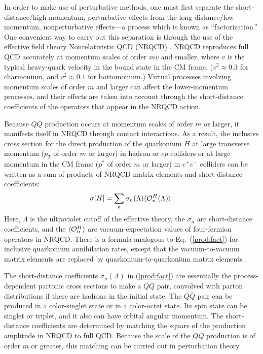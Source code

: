In order to make use of perturbative methods, one must first separate
the short-distance/high-momentum, perturbative effects from the
long-distance/low-momentum, nonperturbative effects---a process which is
known as ``factorization.'' One convenient way to carry out this
separation is through the use of the effective field theory
Nonrelativistic QCD (NRQCD) \cite{Caswell:1985ui,Thacker:1990bm,Bodwin:1994jh}.
NRQCD reproduces full QCD accurately at momentum scales of order $mv$
and smaller, where $v$ is the typical heavy-quark velocity in the bound
state in the CM frame. ($v^2\approx 0.3$ for charmonium, and 
$v^2\approx 0.1$ for bottomonium.) Virtual processes involving momentum
scales of order $m$ and larger can affect the lower-momentum processes,
and their effects are taken into account through the short-distance
coefficients of the operators that appear in the NRQCD action.

Because $Q\bar Q$ production occurs at momentum scales of order $m$ or
larger, it manifests itself in NRQCD through contact interactions. As a
result, the inclusive cross section for the direct production of the
quarkonium $H$ at large transverse momentum ($p_T$ of order $m$ or
larger) in hadron or $ep$ colliders or at large momentum in the CM frame
($p^*$ of order $m$ or larger) in $e^+e^-$ colliders can be written as a
sum of products of NRQCD matrix elements and short-distance coefficients:
%
\begin{equation}
\sigma[H]=\sum_n \sigma_n(\Lambda) \langle {\cal O}_n^H(\Lambda) \rangle.
\label{prod:fact}
\end{equation}
%
Here, $\Lambda$ is the ultraviolet cutoff of the effective theory, the
$\sigma_n$ are short-distance coefficients, and the 
$\langle {\cal O}_n^H \rangle$ 
are vacuum-expectation values of four-fermion
operators in NRQCD. There is a formula analogous to Eq.~(\ref{prod:fact})
for inclusive quarkonium annihilation rates, except that the
vacuum-to-vacuum matrix elements are replaced by
quarkonium-to-quarkonium matrix elements
\cite{Bodwin:1994jh}.

The short-distance coefficients $\sigma_n(\Lambda)$ in
(\ref{prod:fact}) are essentially the process-dependent partonic cross
sections to make a $Q\bar Q$ pair, convolved with parton distributions
if there are hadrons in the initial state. The $Q\bar Q$ pair can be
produced in a color-singlet state or in a color-octet state. Its spin
state can be singlet or triplet, and it also can have orbital angular
momentum. The short-distance coefficients are determined by matching
the square of the production amplitude in NRQCD to full QCD. Because
the scale of the $Q\bar Q$ production is of order $m$ or greater, this
matching can be carried out in perturbation theory.

